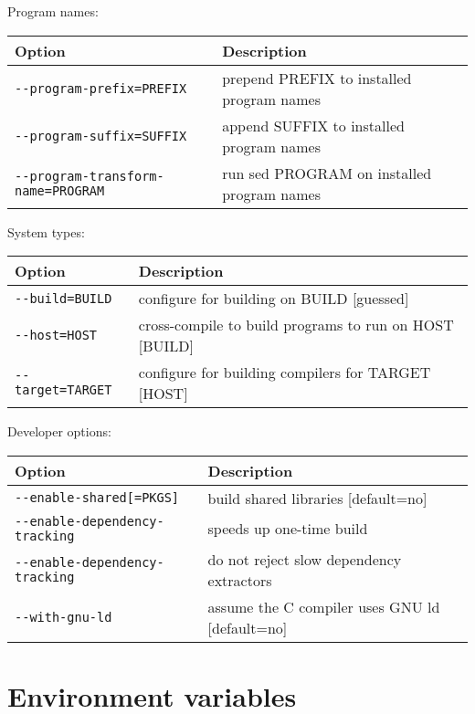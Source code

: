 Program names:

\begin{center}
\begin{tabular}{|l|p{7cm}|}
\hline
\textbf{Option} & \textbf{Description} \\
\hline
\texttt{-{-}program-prefix=PREFIX}          & prepend PREFIX to installed program names \\
\texttt{-{-}program-suffix=SUFFIX}          & append SUFFIX to installed program names \\
\texttt{-{-}program-transform-name=PROGRAM} & run sed PROGRAM on installed program names \\
\hline
\end{tabular}
\end{center}

System types:

\begin{center}
\begin{tabular}{|l|l|}
\hline
\textbf{Option} & \textbf{Description} \\
\hline
\texttt{-{-}build=BUILD}   & configure for building on BUILD [guessed] \\
\texttt{-{-}host=HOST}     & cross-compile to build programs to run on HOST [BUILD] \\
\texttt{-{-}target=TARGET} & configure for building compilers for TARGET [HOST] \\
\hline
\end{tabular}
\end{center}

Developer options:

\begin{center}
\begin{tabular}{|l|l|}
\hline
\textbf{Option} & \textbf{Description} \\
\hline
\texttt{-{-}enable-shared[=PKGS]}        & build shared libraries [default=no] \\
\texttt{-{-}enable-dependency-tracking} & speeds up one-time build \\
\texttt{-{-}enable-dependency-tracking}  & do not reject slow dependency extractors \\
\texttt{-{-}with-gnu-ld}                 & assume the C compiler uses GNU ld [default=no] \\
\hline
\end{tabular}
\end{center}

\section{Environment variables}

